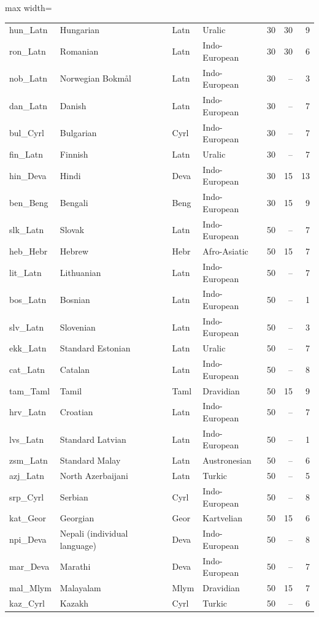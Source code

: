 \begin{table}[p]
\begin{minipage}[t]{0.49\textwidth}
\begin{adjustbox}{max width=\linewidth}
\begin{tabular}[t]{llllrrr}
hun\_Latn & Hungarian & Latn & Uralic & 30 & 30 & 9 \\
ron\_Latn & Romanian & Latn & Indo-European & 30 & 30 & 6 \\
nob\_Latn & Norwegian Bokmål & Latn & Indo-European & 30 & -- & 3 \\
dan\_Latn & Danish & Latn & Indo-European & 30 & -- & 7 \\
bul\_Cyrl & Bulgarian & Cyrl & Indo-European & 30 & -- & 7 \\
fin\_Latn & Finnish & Latn & Uralic & 30 & -- & 7 \\
hin\_Deva & Hindi & Deva & Indo-European & 30 & 15 & 13 \\
ben\_Beng & Bengali & Beng & Indo-European & 30 & 15 & 9 \\
slk\_Latn & Slovak & Latn & Indo-European & 50 & -- & 7 \\
heb\_Hebr & Hebrew & Hebr & Afro-Asiatic & 50 & 15 & 7 \\
lit\_Latn & Lithuanian & Latn & Indo-European & 50 & -- & 7 \\
bos\_Latn & Bosnian & Latn & Indo-European & 50 & -- & 1 \\
slv\_Latn & Slovenian & Latn & Indo-European & 50 & -- & 3 \\
ekk\_Latn & Standard Estonian & Latn & Uralic & 50 & -- & 7 \\
cat\_Latn & Catalan & Latn & Indo-European & 50 & -- & 8 \\
tam\_Taml & Tamil & Taml & Dravidian & 50 & 15 & 9 \\
hrv\_Latn & Croatian & Latn & Indo-European & 50 & -- & 7 \\
lvs\_Latn & Standard Latvian & Latn & Indo-European & 50 & -- & 1 \\
zsm\_Latn & Standard Malay & Latn & Austronesian & 50 & -- & 6 \\
azj\_Latn & North Azerbaijani & Latn & Turkic & 50 & -- & 5 \\
srp\_Cyrl & Serbian & Cyrl & Indo-European & 50 & -- & 8 \\
kat\_Geor & Georgian & Geor & Kartvelian & 50 & 15 & 6 \\
npi\_Deva & Nepali (individual language) & Deva & Indo-European & 50 & -- & 8 \\
mar\_Deva & Marathi & Deva & Indo-European & 50 & -- & 7 \\
mal\_Mlym & Malayalam & Mlym & Dravidian & 50 & 15 & 7 \\
kaz\_Cyrl & Kazakh & Cyrl & Turkic & 50 & -- & 6 \\

\end{tabular}
\end{adjustbox}
\end{minipage}
\end{table}
